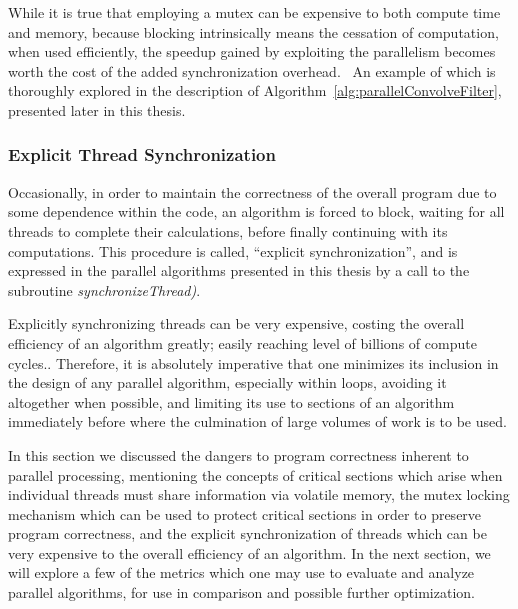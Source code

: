 While it is true that employing a mutex can be expensive to both compute time and memory, because blocking intrinsically means the cessation of computation, when used efficiently, the speedup gained by exploiting the parallelism becomes worth the cost of the added synchronization overhead.~\cite[~p.20]{Lang17} An example of which is thoroughly explored in the description of Algorithm~\ref{alg:parallelConvolveFilter}, presented later in this thesis.

%
%
\subsubsection{Explicit Thread Synchronization}
Occasionally, in order to maintain the correctness of the overall program due to some dependence within the code, an algorithm is forced to block, waiting for all threads to complete their calculations, before finally continuing with its computations. This procedure is called, ``explicit synchronization'', and is expressed in the parallel algorithms presented in this thesis by a call to the subroutine \textit{synchronizeThread)}.

Explicitly synchronizing threads can be very expensive, costing the overall efficiency of an algorithm greatly; easily reaching level of  billions of compute cycles.. Therefore, it is absolutely imperative that one minimizes its inclusion in the design of any parallel algorithm, especially within loops, avoiding it altogether when possible, and limiting its use to sections of an algorithm immediately before where the culmination of large volumes of work is to be used.

In this section we discussed the dangers to program correctness inherent to parallel processing, mentioning the concepts of critical sections which arise when individual threads must share information via volatile memory, the mutex locking mechanism which can be used to protect critical sections in order to preserve program correctness, and the explicit synchronization of threads which can be very expensive to the overall efficiency of an algorithm. In the next section, we will explore a few of the metrics which one may use to evaluate and analyze parallel algorithms, for use in comparison and possible further optimization. 

